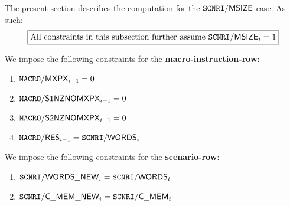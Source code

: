 

The present section describes the computation for the $\texttt{SCNRI}\textsf{/}{\textsf{MSIZE}}$ case. As such:
\[
	\boxed{\text{All constraints in this subsection further assume } \texttt{SCNRI}\textsf{/}{\textsf{MSIZE}}_{i} = 1}
\]

We impose the following constraints for the \textbf{macro-instruction-row}:

\begin{enumerate}
	\item $\texttt{MACRO}\textsf{/}{\textsf{MXPX}}_{i-1} = 0$
    \item $\texttt{MACRO}\textsf{/}{\textsf{S1NZNOMXPX}}_{i-1} = 0$
    \item $\texttt{MACRO}\textsf{/}{\textsf{S2NZNOMXPX}}_{i-1} = 0$
    \item $\texttt{MACRO}\textsf{/}{\textsf{RES}}_{i-1} = \texttt{SCNRI}\textsf{/}{\textsf{WORDS}}_{i}$
\end{enumerate}

We impose the following constraints for the \textbf{scenario-row}:

\begin{enumerate}
	\item $\texttt{SCNRI}\textsf{/}{\textsf{WORDS\_NEW}}_{i} = \texttt{SCNRI}\textsf{/}{\textsf{WORDS}}_{i}$
	\item $\texttt{SCNRI}\textsf{/}{\textsf{C\_MEM\_NEW}}_{i}  =  \texttt{SCNRI}\textsf{/}{\textsf{C\_MEM}}_{i}$
\end{enumerate}